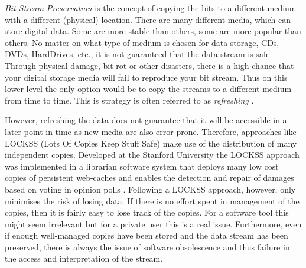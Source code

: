 \textit{Bit-Stream Preservation}
is the concept of copying the bits to a different medium with a different (physical) location. There are many different media, which can store digital data. Some are more stable than others, some are more popular than others. No matter on what type of medium is chosen for data storage, CDs, DVDs, HardDrives, etc., it is not guaranteed that the data stream is safe. Through physical damage, bit rot or other disasters, there is a high chance that your digital storage media will fail to reproduce your bit stream. Thus on this lower level the only option would be to copy the streams to a different medium from time to time. This is strategy is often referred to as \textit{refreshing} \cite{Lee:2002:SOTADP}.

However, refreshing the data does not guarantee that it will be accessible in a later point in time as new media are also error prone. Therefore, approaches like LOCKSS (Lots Of Copies Keep Stuff Safe) \cite{reich2001lpw} make use of the distribution of many independent copies. Developed at the Stanford University the LOCKSS approach was implemented in a librarian software system that deploys many low cost copies of persistent web-caches and enables the detection and repair of damages based on voting in opinion polls \cite{Maniatis:2003:PPR:1165389.945451}.
Following a LOCKSS approach, however, only minimises the risk of losing data. If there is no effort spent in management of the copies, then it is fairly easy to lose track of the copies. For a software tool this might seem irrelevant but for a private user this is a real issue. Furthermore, even if enough well-managed copies have been stored and the data stream has been preserved, there is always the issue of software obsolescence and thus failure in the access and interpretation of the stream. \newline

